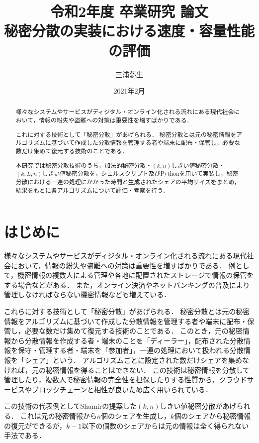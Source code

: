 \documentclass[10pt, a4paper, titlepage]{jsreport}
\title{令和2年度 卒業研究 論文 \\ 秘密分散の実装における速度・容量性能の評価}
\author{三浦夢生}
\date{2021年2月}
\begin{document}
	\maketitle

	\begin{abstract}
		様々なシステムやサービスがディジタル・オンライン化される流れにある現代社会において，情報の紛失や盗難への対策は重要性を増すばかりである．

		これに対する技術として「秘密分散」があげられる．
		秘密分散とは元の秘密情報をアルゴリズムに基づいて作成した分散情報を管理する者や端末に配布・保管し，必要な数だけ集めて復元する技術のことである．

		本研究では秘密分散技術のうち，加法的秘密分散・$(k,n)$しきい値秘密分散・$(k,L,n)$しきい値秘密分散を，シェルスクリプト及びPythonを用いて実装し，秘密分散における一連の処理にかかった時間と生成されたシェアの平均サイズをまとめ，結果をもとに各アルゴリズムについて評価・考察を行う．
	\end{abstract}

	\tableofcontents
	\clearpage

	\chapter{はじめに}
	様々なシステムやサービスがディジタル・オンライン化される流れにある現代社会において，情報の紛失や盗難への対策は重要性を増すばかりである．
	例として，機密情報の複数人による管理や各地に配置されたストレージで情報の保管をする場合などがある．
	また，オンライン決済やネットバンキングの普及により管理しなければならない機密情報なども増えている．
	
	これらに対する技術として「秘密分散」があげられる．
	秘密分散とは元の秘密情報をアルゴリズムに基づいて作成した分散情報を管理する者や端末に配布・保管し，必要な数だけ集めて復元する技術のことである．
	このとき，元の秘密情報から分散情報を作成する者・端末のことを「ディーラー」，配布された分散情報を保守・管理する者・端末を「参加者」，一連の処理において扱われる分散情報を「シェア」という．
	アルゴリズムごとに設定された数だけシェアを集めなければ，元の秘密情報を得ることはできない．
	この技術は秘密情報を分散して管理したり，複数人で秘密情報の完全性を担保したりする性質から，クラウドサービスやブロックチェーンと相性が良いため広く用いられている．

	この技術の代表例としてShamirの提案した$(k,n)$しきい値秘密分散\cite{shamir}があげられる．
	これは元の秘密情報から$n$個のシェアを生成し，$k$個のシェアから秘密情報の復元ができるが，$k-1$以下の個数のシェアからは元の情報は全く得られない手法である．
\end{document}
